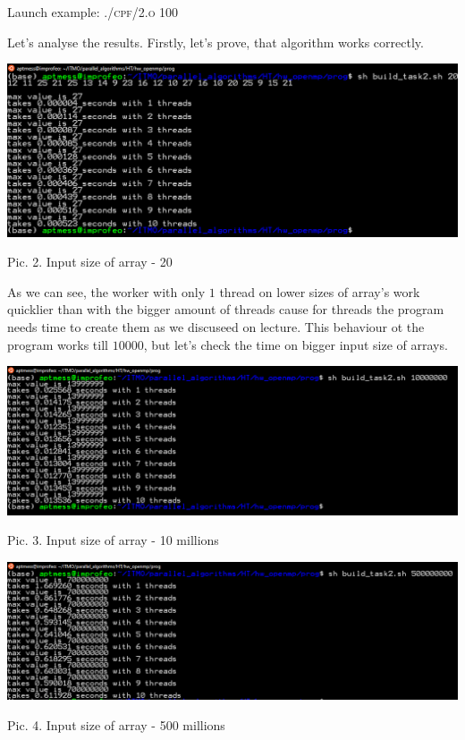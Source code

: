 \documentclass[%
12pt, %
final, %
oneside, %
onecolumn, %
centertags]{article} %
\theoremstyle{plain}
\theoremstyle{definition}
\theoremstyle{remark}
\begin{document}
Launch example: \textsc{./cpf/2.o 100}

Let's analyse the results. Firstly, let's prove, that algorithm works correctly.
\begin{center}

\includegraphics[scale=0.61]{t2_check.png}

Pic. 2. Input size of array - 20
\end{center}

As we can see, the worker with only $1$ thread on lower sizes of array's work quicklier than with the bigger amount of threads cause for threads the program needs time to create them as we discuseed on lecture. This behaviour ot the program works till $10000$, but let's check the time on bigger input size of arrays.

\begin{center}
\includegraphics[scale=0.55]{t2_10_billions.png}

Pic. 3. Input size of array - 10 millions
\end{center}

\begin{center}
\includegraphics[scale=0.55]{t2_500_mil.png}

Pic. 4. Input size of array - 500 millions
\end{center}
\end{document}
